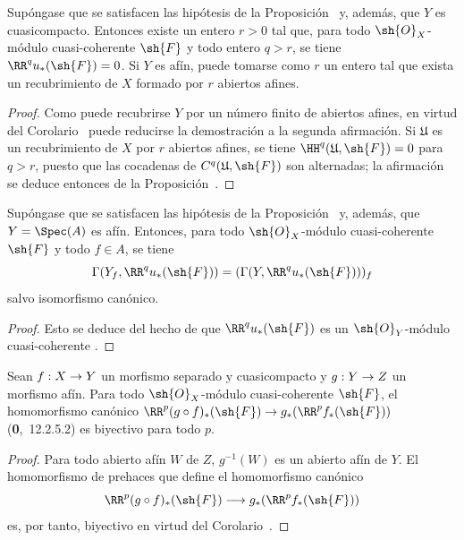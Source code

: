 \documentclass[oneside]{amsart}
\makeatletter
\newcommand{\ega@arrow}[2]{\mathchoice{#1}{#2}{#2}{#2}}
\renewcommand{\to}{\ega@arrow{\longrightarrow}{\rightarrow}}
\let\EGAOriginalLabel\label
\renewcommand{\label}[1]{\phantomsection\EGAOriginalLabel{#1}}
\makeatother
\begin{document}
\begin{corollary}[1.4.12]
\label{III.1.4.12}
Supóngase que se satisfacen las hipótesis de la Proposición~ y, además, que $Y$ es cuasicompacto.
Entonces existe un entero $r>0$ tal que, para todo $\sh{O}_X$-módulo cuasi-coherente $\sh{F}$ y todo entero $q>r$, se tiene $\RR^q u_*(\sh{F})=0$.
Si $Y$ es afín, puede tomarse como $r$ un entero tal que exista un recubrimiento de $X$ formado por $r$ abiertos afines.
\end{corollary}

\begin{proof}
Como puede recubrirse $Y$ por un número finito de abiertos afines, en virtud del Corolario~ puede reducirse la demostración a la segunda afirmación.
Si $\mathfrak{U}$ es un recubrimiento de $X$ por $r$ abiertos afines, se tiene $\HH^q(\mathfrak{U},\sh{F})=0$ para $q>r$, puesto que las cocadenas de $C^q(\mathfrak{U},\sh{F})$ son alternadas; la afirmación se deduce entonces de la Proposición~.
\end{proof}

\begin{corollary}[1.4.13]
\label{III.1.4.13}
Supóngase que se satisfacen las hipótesis de la Proposición~ y, además, que $Y=\Spec(A)$ es afín.
Entonces, para todo $\sh{O}_X$-módulo cuasi-coherente $\sh{F}$ y todo $f\in A$, se tiene
\[
  \Gamma(Y_f,\RR^q u_*(\sh{F}))=(\Gamma(Y,\RR^q u_*(\sh{F})))_f
\]
salvo isomorfismo canónico.
\end{corollary}

\begin{proof}
Esto se deduce del hecho de que $\RR^q u_*(\sh{F})$ es un $\sh{O}_Y$-módulo cuasi-coherente .
\end{proof}

\begin{proposition}[1.4.14]
\label{III.1.4.14}
Sean $f:X\to Y$ un morfismo separado y cuasicompacto y $g:Y\to Z$ un morfismo afín.
Para todo $\sh{O}_X$-módulo cuasi-coherente $\sh{F}$, el homomorfismo canónico $\RR^p(g\circ f)_*(\sh{F})\to g_*(\RR^p f_*(\sh{F}))$ \textup{(\textbf{0},~12.2.5.2)} es biyectivo para todo $p$.
\end{proposition}

\begin{proof}
Para todo abierto afín $W$ de $Z$, $g^{-1}(W)$ es un abierto afín de $Y$.
El homomorfismo de prehaces que define el homomorfismo canónico
\[
  \RR^p(g\circ f)_*(\sh{F})\to g_*(\RR^p f_*(\sh{F}))
\]
 es, por tanto, biyectivo en virtud del Corolario~.
\end{proof}
\end{document}
